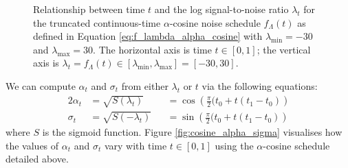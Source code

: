 \documentclass[ oneside,%
                    author={George Herbert},
                    degree={MSci},
                     title={Video Diffusion Models for Climate Simulations},
                  subtitle={}]{dissertation}
\begin{document}
\begin{figure}[htbp]
      \centering
      \caption{Relationship between time $t$ and the log signal-to-noise ratio $\lambda_t$ for the truncated continuous-time $\alpha$-cosine noise schedule $f_\Lambda(t)$ as defined in Equation \ref{eq:f_lambda_alpha_cosine} with $\lambda_{\min}=-30$ and $\lambda_{\max}=30$. The horizontal axis is time $t\in[0,1]$; the vertical axis is $\lambda_t=f_\Lambda(t)\in[\lambda_{\min},\lambda_{\max}]=[-30, 30]$.}
      \label{fig:cosine_lambda_t}
\end{figure}
We can compute $\alpha_t$ and $\sigma_t$ from either $\lambda_t$ or $t$ via the following equations:
\begin{alignat}{2}
      \alpha_t&=\sqrt{S(\lambda_t)}&&=\cos\left(\frac{\pi}{2}(t_0+t(t_1-t_0)\right)\label{eq:alpha_t_alpha_cosine}\\
      \sigma_t&=\sqrt{S(-\lambda_t)}&&=\sin\left(\frac{\pi}{2}(t_0+t(t_1-t_0)\right)\label{eq:sigma_t_alpha_cosine}
\end{alignat}
where $S$ is the sigmoid function. Figure \ref{fig:cosine_alpha_sigma} visualises how the values of $\alpha_t$ and $\sigma_t$ vary with time $t\in[0,1]$ using the $\alpha$-cosine schedule detailed above.
\end{document}
